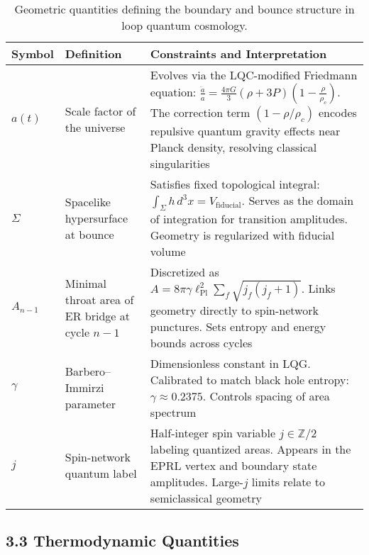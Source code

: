 \begin{table}[h!]
\centering
\begin{tabular}{>{\raggedright}p{3cm}>{\raggedright}p{6.5cm}>{\raggedright\arraybackslash}p{5cm}}
\toprule
\textbf{Symbol} & \textbf{Definition} & \textbf{Constraints and Interpretation} \\
\midrule
$a(t)$ & Scale factor of the universe & Evolves via the LQC-modified Friedmann equation: 
$\frac{\ddot{a}}{a} = \frac{4\pi G}{3}(\rho + 3P)\left(1 - \frac{\rho}{\rho_c}\right)$. The correction term $(1 - \rho/\rho_c)$ encodes repulsive quantum gravity effects near Planck density, resolving classical singularities \cite{ashtekar2006quantum} \\
\addlinespace
$\Sigma$ & Spacelike hypersurface at bounce & Satisfies fixed topological integral: 
$\int_\Sigma h \, d^3x = V_{\text{fiducial}}$. Serves as the domain of integration for transition amplitudes. Geometry is regularized with fiducial volume \cite{rovelli2004quantum} \\
\addlinespace
$A_{n-1}$ & Minimal throat area of ER bridge at cycle $n-1$ & Discretized as $A = 8\pi \gamma \ell_{\text{Pl}}^2 \sum_f \sqrt{j_f(j_f+1)}$. Links geometry directly to spin-network punctures. Sets entropy and energy bounds across cycles \cite{rovelli1995discreteness} \\
\addlinespace
$\gamma$ & Barbero–Immirzi parameter & Dimensionless constant in LQG. Calibrated to match black hole entropy: $\gamma \approx 0.2375$. Controls spacing of area spectrum \cite{meissner2004black} \\
\addlinespace
$j$ & Spin-network quantum label & Half-integer spin variable $j \in \mathbb{Z}/2$ labeling quantized areas. Appears in the EPRL vertex and boundary state amplitudes. Large-$j$ limits relate to semiclassical geometry \\
\bottomrule
\end{tabular}
\caption{Geometric quantities defining the boundary and bounce structure in loop quantum cosmology.}
\end{table}

\subsection*{3.3 Thermodynamic Quantities}

